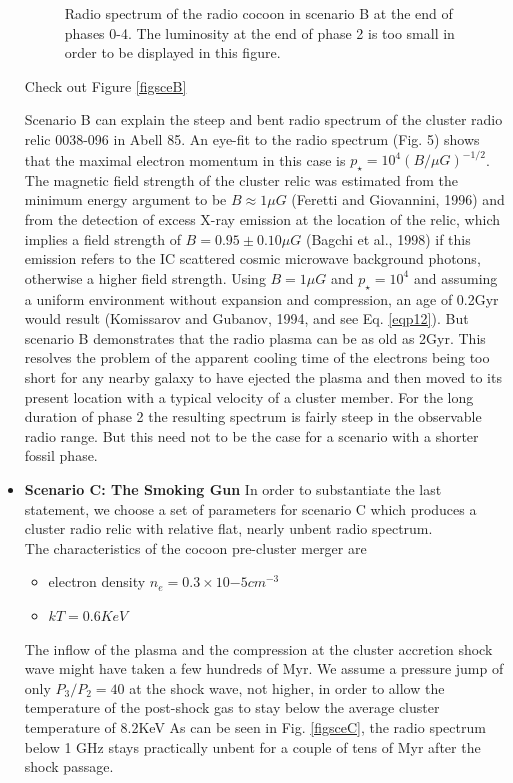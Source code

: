 \documentclass[11pt]{report}
\newcommand{\cbox}{tcolorbox}
\begin{document}
\begin{itemize}
\begin{figure}[h!]
\caption{Radio spectrum of the radio cocoon in scenario B at the end of phases 0-4.  The luminosity at the end of phase 2 is too small in order to be displayed in this figure.}
\end{figure}
Check out Figure \ref{figsceB}
\begin{\cbox}
Scenario B can explain the steep and bent radio spectrum of the cluster radio relic 0038-096 in Abell 85. An eye-fit to the radio spectrum (Fig. 5) shows that the maximal electron momentum in this case is $p_\star = 10^4 (B/\mu G)^{-1/2}$. The magnetic field strength of the cluster relic was estimated from the minimum energy argument to be $B \approx 1\mu G$ (Feretti and Giovannini, 1996) and from the detection of excess X-ray emission at the location of the relic, which implies a field strength of $B = 0.95 \pm 0.10\mu G$ (Bagchi et al., 1998) if this emission refers to the IC scattered cosmic microwave background photons, otherwise a higher field strength. Using $B = 1\mu G$ and $p_\star = 10^4$ and assuming a uniform environment without expansion and compression, an age of 0.2Gyr would result (Komissarov and Gubanov, 1994, and see Eq. \eqref{eqp12}). But scenario B demonstrates that the radio plasma can be as old as 2Gyr. This resolves the problem of the apparent cooling time of the electrons being too short for any nearby galaxy to have ejected the plasma and then moved to its present location with a typical velocity of a cluster member. For the long duration of phase 2 the resulting spectrum is fairly steep in the observable radio range. But this need not to be the case for a scenario with a shorter fossil phase. 
\end{\cbox}
\item \textbf{Scenario C: The Smoking Gun}
 In order to substantiate the last statement, we choose a set of parameters for scenario C which produces a cluster radio relic with relative flat, nearly unbent radio spectrum.\\
 The characteristics of the cocoon pre-cluster merger are
 \begin{itemize}
 \item electron density $n_e=0.3 \times 10{-5}cm^{-3}$\\
 \item $kT=0.6KeV$
\end{itemize}  
 The inflow of the plasma and the compression at the cluster accretion shock wave might have taken a few hundreds of Myr. We assume a pressure jump of only $P_3/P_2 = 40$ at the shock wave, not higher, in order to allow the temperature of the post-shock gas to stay below the average cluster temperature of 8.2KeV  As can be seen in Fig. \ref{figsceC}, the radio spectrum below 1 GHz stays practically unbent for a couple of tens of Myr after the shock passage.

\end{itemize}
\end{document}
